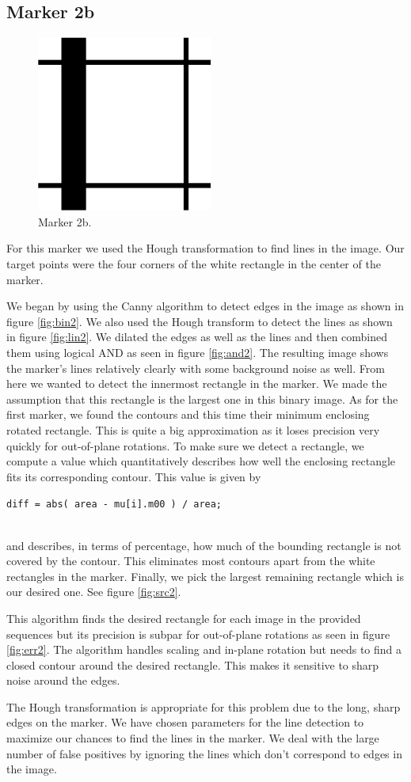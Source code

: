 \documentclass[]{scrartcl}
\begin{document}
\subsection{Marker 2b}
\begin{figure}
	\centering
	\includegraphics[width=0.4\linewidth]{fig/marker2b.png}
	\caption{Marker 2b.}
	\label{fig:mar2}
\end{figure}
For this marker we used the Hough transformation to find lines in the image. Our target points were the four corners of the white rectangle in the center of the marker.\par
We began by using the Canny algorithm to detect edges in the image as shown in figure \ref{fig:bin2}. We also used the Hough transform to detect the lines as shown in figure \ref{fig:lin2}. We dilated the edges as well as the lines and then combined them using logical AND as seen in figure \ref{fig:and2}. The resulting image shows the marker's lines relatively clearly with some background noise as well. From here we wanted to detect the innermost rectangle in the marker. We made the assumption that this rectangle is the largest one in this binary image. As for the first marker, we found the contours and this time their minimum enclosing rotated rectangle. This is quite a big approximation as it loses precision very quickly for out-of-plane rotations. To make sure we detect a rectangle, we compute a value which quantitatively describes how well the enclosing rectangle fits its corresponding contour. This value is given by \\
\centerline{\texttt{diff = abs( area - mu[i].m00 ) / area;}}\\
 and describes, in terms of percentage, how much of the bounding rectangle is not covered by the contour. This eliminates most contours apart from the white rectangles in the marker. Finally, we pick the largest remaining rectangle which is our desired one. See figure \ref{fig:src2}.\par
This algorithm finds the desired rectangle for each image in the provided sequences but its precision is subpar for out-of-plane rotations as seen in figure \ref{fig:err2}. The algorithm handles scaling and in-plane rotation but needs to find a closed contour around the desired rectangle. This makes it sensitive to sharp noise around the edges.\par
The Hough transformation is appropriate for this problem due to the long, sharp edges on the marker. We have chosen parameters for the line detection to maximize our chances to find the lines in the marker. We deal with the large number of false positives by ignoring the lines which don't correspond to edges in the image.\par
\end{document}
